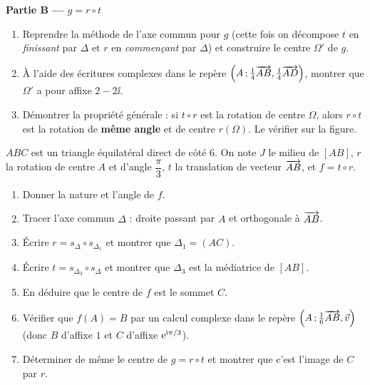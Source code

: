 \textbf{Partie B — $g=r\circ t$}
\begin{enumerate}
	\item Reprendre la méthode de l'axe commun pour $g$ (cette fois on
	décompose $t$ en \emph{finissant} par $\Delta$ et $r$ en
	\emph{commençant} par $\Delta$) et construire le centre $\Omega'$ de $g$.
	\item À l'aide des écritures complexes dans le repère
	$\left(A\,;\frac14\overrightarrow{AB},\frac14\overrightarrow{AD}\right)$, montrer que
	$\Omega'$ a pour affixe $2-2\ii$.
	\item Démontrer la propriété générale : si $t\circ r$ est la rotation de
	centre $\Omega$, alors $r\circ t$ est la rotation de \textbf{même angle}
	et de centre $r(\Omega)$. Le vérifier sur la figure.
\end{enumerate}

$ABC$ est un triangle équilatéral direct de côté $6$. On note $J$ le milieu de
$[AB]$, $r$ la rotation de centre $A$ et d'angle $\dfrac{\pi}{3}$, $t$ la
translation de vecteur $\overrightarrow{AB}$, et $f=t\circ r$.

\begin{center}
\end{center}

\begin{enumerate}
	\item Donner la nature et l'angle de $f$.
	\item Tracer l'axe commun $\Delta$ : droite passant par $A$ et orthogonale
	à $\overrightarrow{AB}$.
	\item Écrire $r=s_{\Delta}\circ s_{\Delta_1}$ et montrer que
	$\Delta_1=(AC)$.
	\item Écrire $t=s_{\Delta_3}\circ s_{\Delta}$ et montrer que $\Delta_3$
	est la médiatrice de $[AB]$.
	\item En déduire que le centre de $f$ est le sommet $C$.
	\item Vérifier que $f(A)=B$ par un calcul complexe dans le repère
	$\left(A\,;\frac16\overrightarrow{AB},\vec v\right)$ (donc $B$ d'affixe $1$ et $C$
	d'affixe $\mathrm{e}^{\mathrm{i}\pi/3}$).
	\item Déterminer de même le centre de $g=r\circ t$ et montrer que c'est
	l'image de $C$ par $r$.
\end{enumerate}

